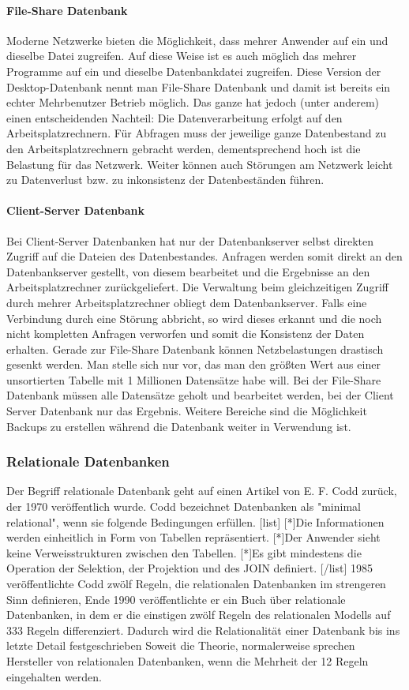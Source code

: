 \paragraph{File-Share Datenbank}
Moderne Netzwerke bieten die Möglichkeit, dass mehrer Anwender auf ein und dieselbe Datei zugreifen. Auf diese Weise ist es auch möglich das mehrer Programme auf ein und dieselbe Datenbankdatei zugreifen. Diese Version der Desktop-Datenbank nennt man File-Share Datenbank und damit ist bereits ein echter Mehrbenutzer Betrieb möglich.
Das ganze hat jedoch (unter anderem) einen entscheidenden Nachteil: Die Daten\-verarbeitung erfolgt auf den Arbeitsplatzrechnern. Für Abfragen muss der jeweilige ganze Datenbestand zu den Arbeitsplatzrechnern gebracht werden, dementsprechend hoch ist die Belastung für das Netzwerk. Weiter können auch Störungen am Netzwerk leicht zu Datenverlust bzw. zu inkonsistenz der Datenbeständen führen.

\paragraph{Client-Server Datenbank}
Bei Client-Server Datenbanken hat nur der Daten\-bank\-server selbst direkten Zugriff auf die Dateien des Daten\-bestandes. Anfragen werden somit direkt an den Daten\-bank\-server gestellt, von diesem bearbeitet und die Ergebnisse an den Arbeits\-platz\-rechner zurück\-geliefert. Die Verwaltung beim gleich\-zeitigen Zugriff durch mehrer Arbeits\-platz\-rechner obliegt dem Daten\-bank\-server. Falls eine Verbindung durch eine Störung abbricht, so wird dieses erkannt und die noch nicht kompletten Anfragen verworfen und somit die Konsistenz der Daten erhalten.
Gerade zur File-Share Datenbank können Netzbelastungen drastisch gesenkt werden. Man stelle sich nur vor, das man den größten Wert aus einer unsortierten Tabelle mit 1 Millionen Datensätze habe will. Bei der File-Share Datenbank müssen alle Datensätze geholt und bearbeitet werden, bei der Client Server Datenbank nur das Ergebnis. Weitere Bereiche sind die Möglichkeit Backups zu erstellen während die Datenbank weiter in Verwendung ist.

\subsubsection{Relationale Datenbanken}
Der Begriff relationale Datenbank geht auf einen Artikel von E. F. Codd zurück, der 1970 veröffentlich wurde. Codd bezeichnet Datenbanken als "minimal relational", wenn sie folgende Bedingungen erfüllen. 
[list]
[*]Die Informationen werden einheitlich in Form von Tabellen repräsentiert. 
[*]Der Anwender sieht keine Verweisstrukturen zwischen den Tabellen. 
[*]Es gibt mindestens die Operation der Selektion, der Projektion und des JOIN definiert. 
[/list]
1985 veröffentlichte Codd zwölf Regeln, die relationalen Datenbanken im strengeren Sinn definieren, Ende 1990 veröffentlichte er ein Buch über relationale Datenbanken, in dem er die einstigen zwölf Regeln des relationalen Modells auf 333 Regeln differenziert. Dadurch wird die Relationalität einer Datenbank bis ins letzte Detail festgeschrieben 
Soweit die Theorie, normalerweise sprechen Hersteller von relationalen Datenbanken, wenn die Mehrheit der 12 Regeln eingehalten werden.

